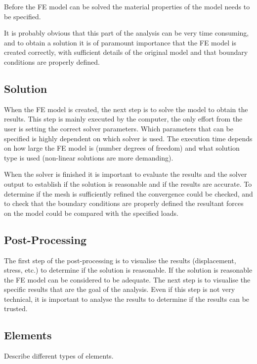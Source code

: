 Before the FE model can be solved the material properties of the model needs to be specified.

It is probably obvious that this part of the analysis can be very time consuming, and to obtain a solution it is of paramount importance that the FE model is created correctly, with sufficient details of the original model and that boundary conditions are properly defined.

\subsection{Solution} %
\label{sub:solution}
When the FE model is created, the next step is to solve the model to obtain the results. This step is mainly executed by the computer, the only effort from the user is setting the correct solver parameters. Which parameters that can be specified is highly dependent on which solver is used. The execution time depends on how large the FE model is (number degrees of freedom) and what solution type is used (non-linear solutions are more demanding).

When the solver is finished it is important to evaluate the results and the solver output to establish if the solution is reasonable and if the results are accurate. To determine if the mesh is sufficiently refined the convergence could be checked, and to check that the boundary conditions are properly defined the resultant forces on the model could be compared with the specified loads.~\cite[p.~303-324]{adams99}

\subsection{Post-Processing} %
\label{sub:post_processing}
The first step of the post-processing is to visualise the results (displacement, stress, etc.) to determine if the solution is reasonable. If the solution is reasonable the FE model can be considered to be adequate. The next step is to visualise the specific results that are the goal of the analysis. Even if this step is not very technical, it is important to analyse the results to determine if the results can be trusted.

\subsection{Elements} %
\label{sub:elements}
Describe different types of elements.

